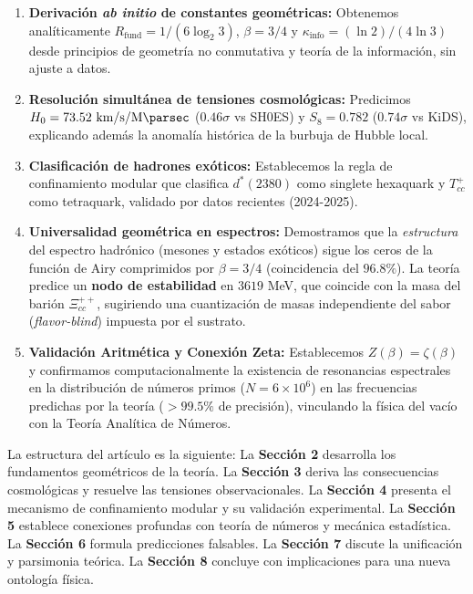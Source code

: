 \documentclass[11pt, a4paper]{article}
\theoremstyle{plain}
\theoremstyle{definition}
\newcommand{\Rfactor}{R_{\text{fund}}}
\newcommand{\Kinfo}{\kappa_{\text{info}}}
\begin{document}
\begin{enumerate}
    \item \textbf{Derivación \textit{ab initio} de constantes geométricas:} Obtenemos analíticamente $\Rfactor = 1/(6\log_2 3)$, $\beta = 3/4$ y $\Kinfo = (\ln 2)/(4\ln 3)$ desde principios de geometría no conmutativa y teoría de la información, sin ajuste a datos.
    
    \item \textbf{Resolución simultánea de tensiones cosmológicas:} Predicimos\\ $H_0 = 73.52\ \si{\kilo\meter\per\second\per\mega\parsec}$ ($0.46\sigma$ vs SH0ES) y $S_8 = 0.782$ ($0.74\sigma$ vs KiDS), explicando además la anomalía histórica de la burbuja de Hubble local.
    
    \item \textbf{Clasificación de hadrones exóticos:} Establecemos la regla de confinamiento modular que clasifica $d^*(2380)$ como singlete hexaquark y $T_{cc}^+$ como tetraquark, validado por datos recientes (2024-2025).
    
    \item \textbf{Universalidad geométrica en espectros:} Demostramos que la \textit{estructura} del espectro hadrónico (mesones y estados exóticos) sigue los ceros de la función de Airy comprimidos por $\beta = 3/4$ (coincidencia del $96.8\%$). La teoría predice un \textbf{nodo de estabilidad} en $3619$ MeV, que coincide con la masa del barión $\Xi_{cc}^{++}$, sugiriendo una cuantización de masas independiente del sabor (\textit{flavor-blind}) impuesta por el sustrato.
    
    \item \textbf{Validación Aritmética y Conexión Zeta:} Establecemos $Z(\beta) = \zeta(\beta)$ y confirmamos computacionalmente la existencia de resonancias espectrales en la distribución de números primos ($N=6\times 10^6$) en las frecuencias predichas por la teoría ($>99.5\%$ de precisión), vinculando la física del vacío con la Teoría Analítica de Números.
\end{enumerate}

La estructura del artículo es la siguiente: La \textbf{Sección 2} desarrolla los fundamentos geométricos de la teoría. La \textbf{Sección 3} deriva las consecuencias cosmológicas y resuelve las tensiones observacionales. La \textbf{Sección 4} presenta el mecanismo de confinamiento modular y su validación experimental. La \textbf{Sección 5} establece conexiones profundas con teoría de números y mecánica estadística. La \textbf{Sección 6} formula predicciones falsables. La \textbf{Sección 7} discute la unificación y parsimonia teórica. La \textbf{Sección 8} concluye con implicaciones para una nueva ontología física.
\end{document}
